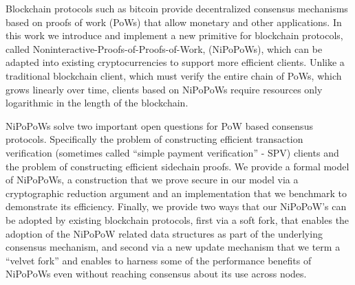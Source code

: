 Blockchain protocols such as bitcoin provide decentralized consensus
mechanisms based on proofs of work (PoWs) 
that allow monetary and other applications. 
%
In this work we introduce and implement a new primitive for blockchain protocols, called Noninteractive-Proofs-of-Proofs-of-Work, (NiPoPoWs), which can be adapted into existing cryptocurrencies to support more efficient clients.
Unlike a traditional blockchain client, which must verify the entire chain of PoWs, which grows linearly over time, clients based on NiPoPoWs require resources only logarithmic in the length of the blockchain.

NiPoPoWs solve two important open questions for PoW based consensus
protocols. Specifically the problem  
of constructing efficient transaction verification (sometimes called
``simple payment verification'' - SPV) clients and 
the problem of constructing efficient sidechain proofs. 
%
%
We provide a formal model of NiPoPoWs, a construction that we prove
secure in our model 
via a cryptographic reduction argument and 
an implementation that we benchmark to demonstrate  its efficiency. 
Finally, we provide two ways that our NiPoPoW's can be adopted by 
 existing blockchain protocols, first via a soft fork, that enables the 
   adoption of the NiPoPoW related data structures
  as part of the underlying consensus mechanism, 
 and second  via a new update mechanism 
that we term a ``velvet fork'' and enables to harness some of
the performance benefits of NiPoPoWs even without reaching consensus about its use
across nodes. 


